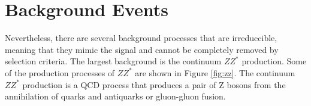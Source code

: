   \section{Background Events}
Nevertheless, there are several background processes that are irreduccible, meaning that they mimic the signal and cannot be completely removed by selection criteria. 
The largest background is the continuum $ZZ^*$ production. Some of the production processes of $ZZ^*$ are shown in Figure \ref{fig:zz}. The continuum $ZZ^*$ production is a QCD process that produces a pair of Z bosons from the annihilation of quarks and antiquarks or gluon-gluon fusion. 

\begin{figure}[htbp]
    \centering
    \begin{minipage}{0.32\textwidth}
        \centering
    \end{minipage}
    \begin{minipage}{0.32\textwidth}
        \centering
\end{minipage}
\end{figure}
